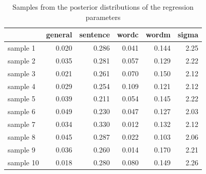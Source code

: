 \documentclass[11pt,a4paper,twoside]{book}
\newenvironment{knitrout}{}{} %
\begin{document}
\begin{knitrout}
\color{fgcolor}\begin{table}

\caption{\label{tab:empirical.data.postsample2}Samples from the posterior distributions of the regression parameters}
\centering
\begin{tabular}[t]{lrrrrr}
\toprule
  & general & sentence & wordc & wordm & sigma\\
\midrule
sample 1 & 0.020 & 0.286 & 0.041 & 0.144 & 2.25\\
sample 2 & 0.035 & 0.281 & 0.057 & 0.129 & 2.22\\
sample 3 & 0.021 & 0.261 & 0.070 & 0.150 & 2.12\\
sample 4 & 0.029 & 0.254 & 0.109 & 0.121 & 2.12\\
sample 5 & 0.039 & 0.211 & 0.054 & 0.145 & 2.22\\
sample 6 & 0.049 & 0.230 & 0.047 & 0.127 & 2.03\\
sample 7 & 0.034 & 0.330 & 0.012 & 0.132 & 2.12\\
sample 8 & 0.045 & 0.287 & 0.022 & 0.103 & 2.06\\
sample 9 & 0.036 & 0.260 & 0.014 & 0.170 & 2.21\\
sample 10 & 0.018 & 0.280 & 0.080 & 0.149 & 2.26\\
\bottomrule
\end{tabular}
\end{table}


\end{knitrout}
\end{document}
